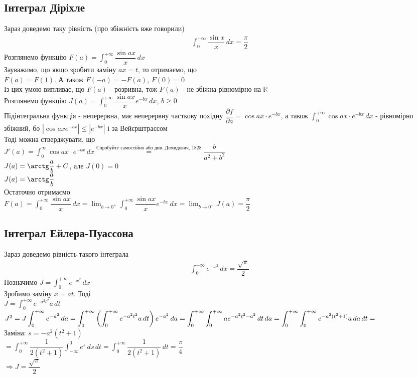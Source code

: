 \documentclass[a4paper, 14pt]{extarticle}
\def\huge{\displaystyle}
\def\bigline{\vspace{5mm}\\}
\theoremstyle{theoremdd}
\theoremstyle{theoremdd}
\theoremstyle{theoremdd}
\theoremstyle{theoremdd}
\theoremstyle{theoremdd}
\theoremstyle{theoremdd}
\theoremstyle{theoremdd}
\theoremstyle{theoremdd}
\def\departial#1#2{\dfrac{\partial {#1}}{\partial {#2}}}
\begin{document}
\subsection{Інтеграл Діріхле}
Зараз доведемо таку рівність (про збіжність вже говорили)
\begin{align*}
\int_0^{+\infty} \dfrac{\sin x}{x}\,dx = \dfrac{\pi}{2}
\end{align*}
Розглянемо функцію $F(a) = \huge \int_0^{+\infty} \dfrac{\sin ax}{x}\,dx$\\
Зауважимо, що якщо зробити заміну $ax =t$, то отримаємо, що \\ $F(a) = F(1)$. А також $F(-a) = -F(a)$, $F(0)=0$\\
Із цих умою випливає, що $F(a)$ - розривна, тож $F(a)$ - не збіжна рівномірно на $\mathbb{R}$\\
Розглянемо функцію $J(a) = \huge \int_0^{+\infty} \dfrac{\sin ax}{x} e^{-bx}\,dx$, $b \geq 0$\\
Підінтегральна функція - неперервна, має неперервну часткову похідну $\departial{f}{a} = \cos ax \cdot e^{-bx}$, а також $\huge \int_0^{+\infty} \cos ax \cdot e^{-bx}\,dx$ - рівномірно збіжний, бо $|\cos ax e^{-bx}| \leq |e^{-bx}|$ і за Вейєрштрассом\\
Тоді можна стверджувати, що\\
$J'(a) = \huge\int_0^{\infty} \cos ax \cdot e^{-bx}\,dx \overset{\text{Спробуйте самостійно або див. Демидович, 1828}}{=} \dfrac{b}{a^2+b^2}$\\
$J(a) = \arctg \dfrac{a}{b} + C$, але $J(0) = 0$\\
$J(a) = \arctg \dfrac{a}{b}$\\
Остаточно отримаємо\\
$F(a) = \huge \int_0^{+\infty} \dfrac{\sin ax}{x}\,dx = \lim_{b \to 0^+} \int_0^{+\infty} \dfrac{\sin ax}{x} e^{-bx}\,dx = \lim_{b \to 0^+} J(a) = \dfrac{\pi}{2}$
\bigline

\subsection{Інтеграл Ейлера-Пуассона}
Зараз доведемо рівність такого інтеграла
\begin{align*}
\int_0^{+\infty} e^{-x^2}\,dx = \dfrac{\sqrt{\pi}}{2}
\end{align*}
Позначимо $J = \huge \int_0^{+\infty} e^{-x^2}\,dx$\\
Зробимо заміну $x = at$. Тоді\\
$J = \huge \int_0^{+\infty} e^{-a^2 t^2}a \,dt$\\
$J^2 = \huge J \int_0^{+\infty} e^{-a^2}\,da = \int_0^{+\infty} \left( \int_0^{+\infty} e^{-a^2 t^2} a\,dt \right) e^{-a^2}\,da = \int_0^{+\infty} \int_0^{+\infty} ae^{-a^2t^2-a^2}\,dt\,da \\ = \int_0^{+\infty} \int_0^{+\infty} e^{-a^2(t^2+1)} a\,da \,dt =$\\
Заміна: $s = -a^2(t^2+1)$\\
$= \huge \int_0^{+\infty} \dfrac{1}{2(t^2+1)} \int_{-\infty}^0 e^s\,ds\,dt = \int_0^{+\infty} \dfrac{1}{2(t^2+1)}\,dt = \dfrac{\pi}{4}$\\
$\Rightarrow J = \dfrac{\sqrt{\pi}}{2}$
\end{document}
